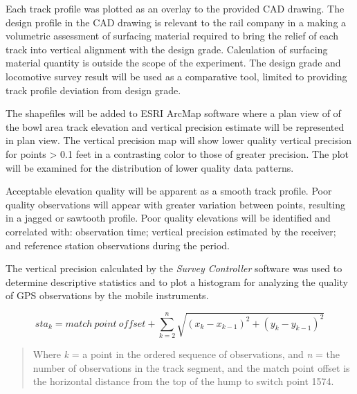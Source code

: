 Each track profile was plotted as an overlay to the provided CAD drawing. The design profile in the CAD drawing is relevant to the rail company in a making a volumetric assessment of surfacing material required to bring the relief of each track into vertical alignment with the design grade. Calculation of surfacing material quantity is outside the scope of the experiment. The design grade and locomotive survey result will be used as a comparative tool, limited to providing track profile deviation from design grade.

The shapefiles will be added to ESRI ArcMap software where a plan view of of the bowl area track elevation and vertical precision estimate will be represented in plan view. The vertical precision map will show lower quality vertical precision for points > 0.1 feet in a contrasting color to those of greater precision. The plot will be examined for the distribution of lower quality data patterns.

Acceptable elevation quality will be apparent as a smooth track profile. Poor quality observations will appear with greater variation between points, resulting in a jagged or sawtooth profile. Poor quality elevations will be identified and correlated with: observation time; vertical precision estimated by the receiver; and reference station observations during the period.

The vertical precision calculated by the \emph{Survey Controller} software was used to determine descriptive statistics and to plot a histogram for analyzing the quality of GPS observations by the mobile instruments.

	\begin{equation}
	{sta_k} = {match~point~offset} + {\sum_{k=2}^n}  {\sqrt{(x_k - x_{k-1})^2 +( y_k - y_{k-1})^2}}
	\label{eq:horzSta}
	\end{equation}
\begin{quotation}
Where \emph{k} =  a point in the ordered sequence of observations, and \emph{n} = the number of observations in the track segment, and the match point offset is the horizontal distance from the top of the hump to switch point 1574.
\end{quotation}

